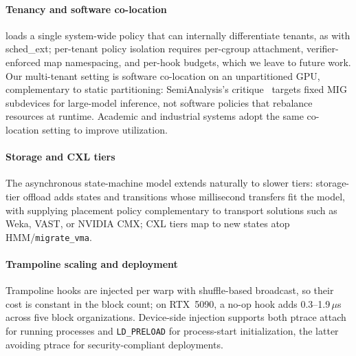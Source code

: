 \paragraph{Tenancy and software co-location}
\sys{} loads a single system-wide policy that can internally differentiate tenants, as with sched\_ext; per-tenant policy isolation requires per-cgroup attachment, verifier-enforced map namespacing, and per-hook budgets, which we leave to future work.
Our multi-tenant setting is software co-location on an unpartitioned GPU, complementary to static partitioning: SemiAnalysis's critique~\cite{semianalysis2025partitioning} targets fixed MIG subdevices for large-model inference, not software policies that rebalance resources at runtime.
Academic and industrial systems adopt the same co-location setting to improve utilization.

\paragraph{Storage and CXL tiers}
The asynchronous state-machine model extends naturally to slower tiers: storage-tier offload adds states and transitions whose millisecond transfers fit the model, with \sys{} supplying placement policy complementary to transport solutions such as Weka, VAST, or NVIDIA CMX; CXL tiers map to new states atop HMM/\texttt{migrate\_vma}.

\paragraph{Trampoline scaling and deployment}
Trampoline hooks are injected per warp with shuffle-based broadcast, so their cost is constant in the block count; on RTX~5090, a no-op hook adds 0.3--1.9\,$\mu$s across five block organizations.
Device-side injection supports both ptrace attach for running processes and \texttt{LD\_PRELOAD} for process-start initialization, the latter avoiding ptrace for security-compliant deployments.

